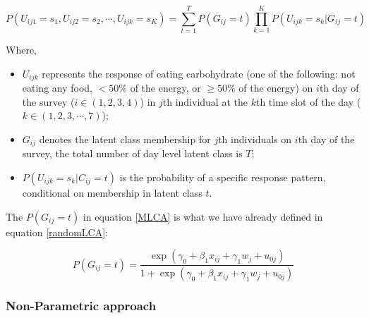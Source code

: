 \begin{equation}
P(U_{ij1} = s_1, U_{ij2} = s_2, \cdots, U_{ijk} = s_{K}) = \sum_{t=1}^{T}P(G_{ij}=t)\prod_{k=1}^{K}P(U_{ijk} = s_k | G_{ij} = t)
\label{MLCA}
\end{equation}
\vspace{-0.8cm}


Where, 

\begin{itemize}
	\item $ U_{ijk} $ represents the response of eating carbohydrate (one of the following: not eating any food, $< 50\%$ of the energy, or $\geqslant 50\%$ of the energy) on $i$th day of the survey ($i \in (1,2,3,4)$) in $j$th individual at the $k$th time slot of the day ($k \in (1, 2, 3, \cdots, 7)$);
	\item $G_{ij}$ denotes the latent class membership for $j$th individuals on $i$th day of the survey, the total number of day level latent class is $T$;
	\item $P(U_{ijk} = s_k|C_{ij} = t)$ is the probability of a specific response pattern, conditional on membership in latent class $t$.
\end{itemize}


The $P(G_{ij} = t)$ in equation \ref{MLCA} is what we have already defined in equation \ref{randomLCA}: \vspace{-0.3cm} 

\begin{equation}
P(G_{ij} = t) = \frac{\exp{(\gamma_0 + \beta_{1}x_{ij} + \gamma_1 w_j + u_{0j})}}{1 + \exp{(\gamma_0 + \beta_{1}x_{ij} + \gamma_1 w_j + u_{0j})}} 
\end{equation}

\vspace{-0.5cm}
\subsubsection{Non-Parametric approach}\vspace{-0.3cm}


